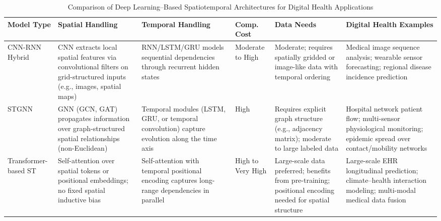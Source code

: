 \documentclass[acmsmall]{acmart}
\begin{document}
\begin{table}[htbp]
\centering
\caption{Comparison of Deep Learning–Based Spatiotemporal Architectures for Digital Health Applications}
\label{tab:st-model-comparison}
\small
\renewcommand{\arraystretch}{1.35}
\begin{tabularx}{\textwidth}{>{\raggedright\arraybackslash}p{2.2cm} >{\raggedright\arraybackslash}p{2.5cm} >{\raggedright\arraybackslash}p{2.5cm} >{\raggedright\arraybackslash}p{1.4cm} >{\raggedright\arraybackslash}p{1.8cm} >{\raggedright\arraybackslash}X}
\toprule
\textbf{Model Type} & \textbf{Spatial Handling} & \textbf{Temporal Handling} & \textbf{Comp. Cost} & \textbf{Data Needs} & \textbf{Digital Health Examples} \\
\midrule
 
CNN-RNN Hybrid
& CNN extracts local spatial features via convolutional filters on grid-structured inputs (e.g., images, spatial maps)
& RNN/LSTM/GRU models sequential dependencies through recurrent hidden states
& Moderate to High
& Moderate; requires spatially gridded or image-like data with temporal ordering
& Medical image sequence analysis; wearable sensor forecasting; regional disease incidence prediction \\
 
\addlinespace[4pt]
 
STGNN
& GNN (GCN, GAT) propagates information over graph-structured spatial relationships (non-Euclidean)
& Temporal modules (LSTM, GRU, or temporal convolution) capture evolution along the time axis
& High
& Requires explicit graph structure (e.g., adjacency matrix); moderate to large labeled data
& Hospital network patient flow; multi-sensor physiological monitoring; epidemic spread over contact/mobility networks \\
 
\addlinespace[4pt]
 
Transformer-based ST
& Self-attention over spatial tokens or positional embeddings; no fixed spatial inductive bias
& Self-attention with temporal positional encoding captures long-range dependencies in parallel
& High to Very High
& Large-scale data preferred; benefits from pre-training; positional encoding needed for spatial structure
& Large-scale EHR longitudinal prediction; climate–health interaction modeling; multi-modal medical data fusion \\
 
\bottomrule
\end{tabularx}
\end{table}
 
\end{document}
